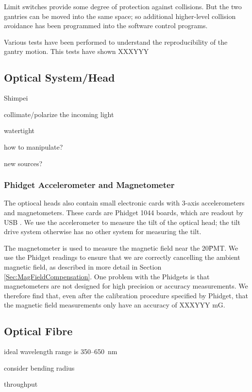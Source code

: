 Limit switches provide some degree of protection against collisions.  But the two gantries can
be moved into the same space; so additional higher-level collision avoidance has been
programmed into the software control programs.



Various tests have been performed to understand the reproducibility of the gantry motion.  This tests have shown
XXXYYY






\subsection{Optical System/Head}

Shimpei

collimate/polarize the incoming light

watertight

how to manipulate?

new sources?


\subsubsection{Phidget Accelerometer and Magnetometer}

The optiocal heads also contain small electronic cards with 3-axis accelerometers and
magnetometers.  These cards are Phidget 1044 boards, which are readout by USB \cite{PhidgetRef}.
We use the accelerometer to measure the tilt of the optical head; the tilt drive system
otherwise has no other system for measuring the tilt.

The magnetometer is used to measure the magnetic field near the 20\" PMT.  We use the Phidget
readings to ensure that we are correctly cancelling the ambient magnetic field, as described
in more detail in Section \ref{Sec:MagFieldCompensation}.
One problem with the Phidgets is that magnetometers are not designed for high precision or accuracy  measurements.
We therefore find that, even after the calibration procedure specified by Phidget, that the
magnetic field measurements only have an accuracy of XXXYYY mG.


\subsection{Optical Fibre}
ideal wavelength range is 350--650~nm

consider bending radius

throughput

